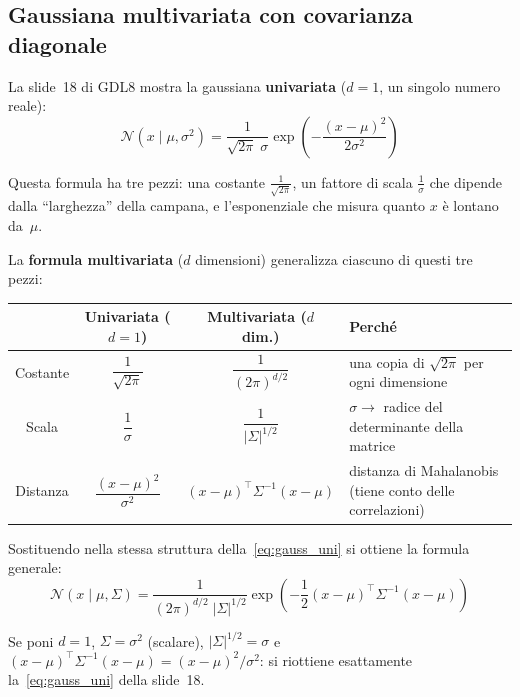 \documentclass[11pt,a4paper]{article}
\begin{document}
\subsection{Gaussiana multivariata con covarianza diagonale}

La slide~18 di GDL8 mostra la gaussiana \textbf{univariata} ($d=1$,
un singolo numero reale):
\begin{equation}\label{eq:gauss_uni}
  \mathcal{N}(x \mid \mu, \sigma^2)
  = \frac{1}{\sqrt{2\pi}\;\sigma}
    \exp\!\left(-\frac{(x - \mu)^2}{2\sigma^2}\right)
\end{equation}

Questa formula ha tre pezzi: una costante $\frac{1}{\sqrt{2\pi}}$,
un fattore di scala $\frac{1}{\sigma}$ che dipende dalla ``larghezza''
della campana, e l'esponenziale che misura quanto $x$ \`{e} lontano
da~$\mu$.

\medskip

La \textbf{formula multivariata} ($d$ dimensioni) generalizza
ciascuno di questi tre pezzi:

\begin{center}
\renewcommand{\arraystretch}{1.6}
\begin{tabular}{c c c l}
\toprule
& \textbf{Univariata} ($d=1$) & \textbf{Multivariata} ($d$ dim.) &
\textbf{Perch\'{e}} \\
\midrule
Costante &
$\dfrac{1}{\sqrt{2\pi}}$ &
$\dfrac{1}{(2\pi)^{d/2}}$ &
una copia di $\sqrt{2\pi}$ per ogni dimensione \\[6pt]
Scala &
$\dfrac{1}{\sigma}$ &
$\dfrac{1}{|\Sigma|^{1/2}}$ &
$\sigma \to$ radice del determinante della matrice \\[6pt]
Distanza &
$\dfrac{(x-\mu)^2}{\sigma^2}$ &
$(x{-}\mu)^\top \Sigma^{-1}(x{-}\mu)$ &
distanza di Mahalanobis (tiene conto delle correlazioni) \\
\bottomrule
\end{tabular}
\end{center}

\medskip
Sostituendo nella stessa struttura della~\eqref{eq:gauss_uni} si
ottiene la formula generale:
\begin{equation}\label{eq:gauss_full}
  \mathcal{N}(x \mid \mu, \Sigma) = \frac{1}{(2\pi)^{d/2}
  \;|\Sigma|^{1/2}} \exp\!\left(-\frac{1}{2}(x-\mu)^\top
  \Sigma^{-1}(x-\mu)\right)
\end{equation}

Se poni $d=1$, $\Sigma = \sigma^2$ (scalare), $|\Sigma|^{1/2} = \sigma$
e $(x{-}\mu)^\top\Sigma^{-1}(x{-}\mu) = (x{-}\mu)^2/\sigma^2$:
si riottiene esattamente la~\eqref{eq:gauss_uni} della slide~18.
\end{document}
